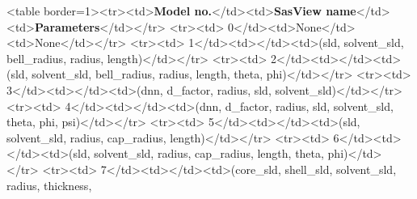 \textless{}table border=1\textgreater{}\textless{}tr\textgreater{}\textless{}td\textgreater{}\textbf{Model no.}\textless{}/td\textgreater{}\textless{}td\textgreater{}\textbf{SasView name}\textless{}/td\textgreater{}\textless{}td\textgreater{}\textbf{Parameters}\textless{}/td\textgreater{}\textless{}/tr\textgreater{} \textless{}tr\textgreater{}\textless{}td\textgreater{} 0\textless{}/td\textgreater{}\textless{}td\textgreater{}None\textless{}/td\textgreater{}\textless{}td\textgreater{}None\textless{}/td\textgreater{}\textless{}/tr\textgreater{} \textless{}tr\textgreater{}\textless{}td\textgreater{} 1\textless{}/td\textgreater{}\textless{}td\textgreater{}\textless{}/td\textgreater{}\textless{}td\textgreater{}(sld, solvent\_sld, bell\_radius, radius, length)\textless{}/td\textgreater{}\textless{}/tr\textgreater{} \textless{}tr\textgreater{}\textless{}td\textgreater{} 2\textless{}/td\textgreater{}\textless{}td\textgreater{}\textless{}/td\textgreater{}\textless{}td\textgreater{}(sld, solvent\_sld, bell\_radius, radius, length, theta, phi)\textless{}/td\textgreater{}\textless{}/tr\textgreater{} \textless{}tr\textgreater{}\textless{}td\textgreater{} 3\textless{}/td\textgreater{}\textless{}td\textgreater{}\textless{}/td\textgreater{}\textless{}td\textgreater{}(dnn, d\_factor, radius, sld, solvent\_sld)\textless{}/td\textgreater{}\textless{}/tr\textgreater{} \textless{}tr\textgreater{}\textless{}td\textgreater{} 4\textless{}/td\textgreater{}\textless{}td\textgreater{}\textless{}/td\textgreater{}\textless{}td\textgreater{}(dnn, d\_factor, radius, sld, solvent\_sld, theta, phi, psi)\textless{}/td\textgreater{}\textless{}/tr\textgreater{} \textless{}tr\textgreater{}\textless{}td\textgreater{} 5\textless{}/td\textgreater{}\textless{}td\textgreater{}\textless{}/td\textgreater{}\textless{}td\textgreater{}(sld, solvent\_sld, radius, cap\_radius, length)\textless{}/td\textgreater{}\textless{}/tr\textgreater{} \textless{}tr\textgreater{}\textless{}td\textgreater{} 6\textless{}/td\textgreater{}\textless{}td\textgreater{}\textless{}/td\textgreater{}\textless{}td\textgreater{}(sld, solvent\_sld, radius, cap\_radius, length, theta, phi)\textless{}/td\textgreater{}\textless{}/tr\textgreater{} \textless{}tr\textgreater{}\textless{}td\textgreater{} 7\textless{}/td\textgreater{}\textless{}td\textgreater{}\textless{}/td\textgreater{}\textless{}td\textgreater{}(core\_sld, shell\_sld, solvent\_sld, radius, thickness, 